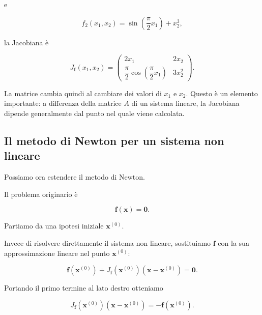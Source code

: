 e

\begin{equation*}
    f_2(x_1,x_2)
    =
    \sin\left(\frac{\pi}{2}x_1\right)+x_2^3,
\end{equation*}

la Jacobiana è

\begin{equation*}
J_{\mathbf{f}}(x_1,x_2)
=
\begin{pmatrix}
2x_1 & 2x_2\\[2mm]
\dfrac{\pi}{2}
\cos\left(\dfrac{\pi}{2}x_1\right)
&
3x_2^2
\end{pmatrix}.
\label{eq:jacobian-example}
\end{equation*}

La matrice cambia quindi al cambiare dei valori di $x_1$ e $x_2$.
Questo è un elemento importante: a differenza della matrice $A$ di
un sistema lineare, la Jacobiana dipende generalmente dal punto nel
quale viene calcolata.


\subsection{Il metodo di Newton per un sistema non lineare}

Possiamo ora estendere il metodo di Newton.

Il problema originario è

\begin{equation*}
    \mathbf{f}(\mathbf{x})=\mathbf{0}.
\end{equation*}

Partiamo da una ipotesi iniziale $\mathbf{x}^{(0)}$.

Invece di risolvere direttamente il sistema non lineare, sostituiamo
$\mathbf{f}$ con la sua approssimazione lineare nel punto
$\mathbf{x}^{(0)}$:

\begin{equation*}
    \mathbf{f}(\mathbf{x}^{(0)})
    +
    J_{\mathbf{f}}(\mathbf{x}^{(0)})
    \left(
        \mathbf{x}-\mathbf{x}^{(0)}
    \right)
    =
    \mathbf{0}.
    \label{eq:newton-system-linearization}
\end{equation*}

Portando il primo termine al lato destro otteniamo

\begin{equation*}
    J_{\mathbf{f}}(\mathbf{x}^{(0)})
    \left(
        \mathbf{x}-\mathbf{x}^{(0)}
    \right)
    =
    -\mathbf{f}(\mathbf{x}^{(0)}).
    \label{eq:newton-system-step}
\end{equation*}

